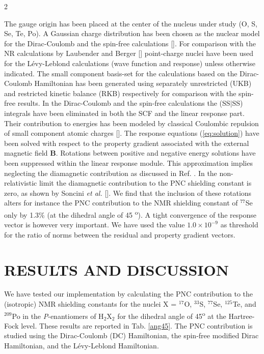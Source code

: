 \documentclass[a4paper,12pt,english]{article}
\begin{document}
\begin{spacing}{2}
\par The gauge origin has been placed at the center of the nucleus under study (O, S, Se, Te, Po). A Gaussian charge distribution has been chosen as the nuclear model for the Dirac-Coulomb and the spin-free calculations [\cite{luuk:gnuc}]. For comparison with the NR calculations by Laubender and Berger [\cite{berger2003chemphyschem}] point-charge nuclei have been used for the L\'evy-Leblond calculations (wave function and response) unless otherwise indicated. The small component basis-set for the calculations based on the Dirac-Coulomb Hamiltonian has been generated using separately unrestricted (UKB) and re\-stricted kinetic balance (RKB) respectively for comparison with the spin-free results. In the Dirac-Coulomb and the spin-free calculations the (SS$\vert$SS) integrals have been eliminated in both the SCF and the linear response part. Their contribution to energies has been modeled by classical Coulombic repulsion of small component atomic charges [\cite{visscher1997theorchemacc}]. 
The response equations (\ref{eq:solution}) have been solved with respect to the property gradient associated 
with the external magnetic field $\mathbf{B}$. Rotations between positive and negative energy solutions 
have been suppressed within the linear response module. This approximation implies neglecting the 
diamagnetic contribution as discussed in Ref. \cite{aucar1999jchemphys}. In the non-relativistic limit
the diamagnetic contribution to the PNC shielding constant is zero, as shown by Soncini \emph{et al.} 
[\cite{lazzeretti2003physreva}]. We find that the inclusion of these rotations alters for instance 
the PNC contribution to the NMR shielding  constant of $^{77}$Se only by 1.3\% (at the dihedral angle of 
45 \textsuperscript{o}). A tight convergence of the response vector is however very important. 
We have used the value $1.0\times 10^{-9}$ as threshold for the ratio of norms between the residual 
and property gradient vectors.
\section{RESULTS AND DISCUSSION}

\noindent We have tested our implementation by calculating the PNC contribution to the (isotropic) NMR shielding constants for the nuclei X = $^{17}$O, $^{33}$S, $^{77}$Se, $^{125}$Te, and $^{209}$Po in the \emph{P}-enantiomers of H$_2$X$_2$ for the dihedral angle of 45\textsuperscript{o} at the Hartree-Fock level. These results are reported in Tab. \ref{ang45}. The PNC contribution is studied using the Dirac-Coulomb (DC) Hamiltonian, the spin-free modified Dirac Hamiltonian, and the L\'evy-Leblond Hamiltonian.


\end{spacing}
\end{document}
